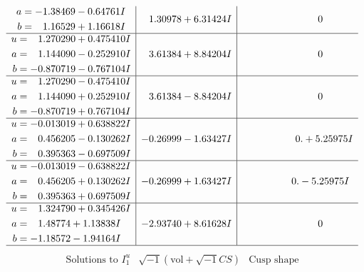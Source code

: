 \documentclass[1p]{elsarticle_modified}
\theoremstyle{definition}
\newcommand{\I}{\sqrt{-1}}
\begin{document}
$$\begin{array}{c|c|c}
\begin{aligned}
a &= -1.38469 - 0.64761 I \\
b &= \phantom{-}1.16529 + 1.16618 I\end{aligned}
 & \phantom{-}1.30978 + 6.31424 I & \phantom{-0.000000 } 0 \\ \hline\begin{aligned}
u &= \phantom{-}1.270290 + 0.475410 I \\
a &= \phantom{-}1.144090 - 0.252910 I \\
b &= -0.870719 - 0.767104 I\end{aligned}
 & \phantom{-}3.61384 + 8.84204 I & \phantom{-0.000000 } 0 \\ \hline\begin{aligned}
u &= \phantom{-}1.270290 - 0.475410 I \\
a &= \phantom{-}1.144090 + 0.252910 I \\
b &= -0.870719 + 0.767104 I\end{aligned}
 & \phantom{-}3.61384 - 8.84204 I & \phantom{-0.000000 } 0 \\ \hline\begin{aligned}
u &= -0.013019 + 0.638822 I \\
a &= \phantom{-}0.456205 - 0.130262 I \\
b &= \phantom{-}0.395363 - 0.697509 I\end{aligned}
 & -0.26999 - 1.63427 I & \phantom{-0.000000 -}0. + 5.25975 I \\ \hline\begin{aligned}
u &= -0.013019 - 0.638822 I \\
a &= \phantom{-}0.456205 + 0.130262 I \\
b &= \phantom{-}0.395363 + 0.697509 I\end{aligned}
 & -0.26999 + 1.63427 I & \phantom{-0.000000 } 0. - 5.25975 I \\ \hline\begin{aligned}
u &= \phantom{-}1.324790 + 0.345426 I \\
a &= \phantom{-}1.48774 + 1.13838 I \\
b &= -1.18572 - 1.94164 I\end{aligned}
 & -2.93740 + 8.61628 I & \phantom{-0.000000 } 0\\
 \hline 
 \end{array}$$\newpage$$\begin{array}{c|c|c}  
\text{Solutions to }I^u_{1}& \I (\text{vol} + \sqrt{-1}CS) & \text{Cusp shape}\\
 \hline 
\begin{aligned}

\end{aligned}
\end{array}$$
\end{document}
